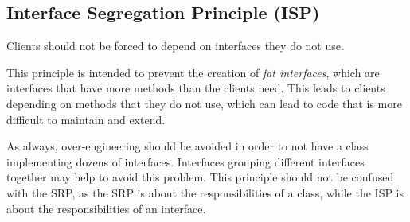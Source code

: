 \subsection{Interface Segregation Principle (ISP)}
\begin{principio}
    Clients should not be forced to depend on interfaces they do not use.
\end{principio}

This principle is intended to prevent the creation of \emph{fat interfaces}, which are interfaces that have more methods than the clients need. This leads to clients depending on methods that they do not use, which can lead to code that is more difficult to maintain and extend.

As always, over-engineering should be avoided in order to not have a class implementing dozens of interfaces. Interfaces grouping different interfaces together may help to avoid this problem.
This principle should not be confused with the SRP, as the SRP is about the responsibilities of a class, while the ISP is about the responsibilities of an interface.\\

